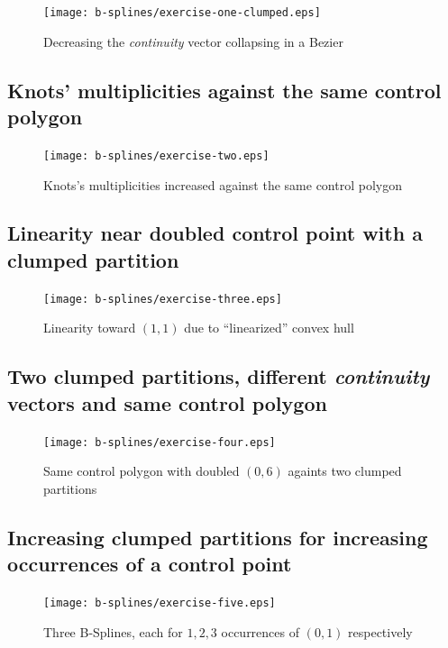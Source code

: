 \documentclass{article}
\begin{document}
\begin{figure}[h!]
  \centering
  \texttt{[image: b-splines/exercise-one-clumped.eps]}
  \caption{Decreasing the \emph{continuity} vector collapsing in a Bezier }
  \label{fig:bspline-exercise-one-clumped}
\end{figure}

\subsection{Knots' multiplicities against the same control polygon}
\begin{figure}[h!]
  \centering
  \texttt{[image: b-splines/exercise-two.eps]}
  \caption{Knots's multiplicities increased against the same control polygon }
  \label{fig:bspline-exercise-two}
\end{figure}

\subsection{Linearity near doubled control point with a clumped partition}
\begin{figure}[h!]
  \centering
  \texttt{[image: b-splines/exercise-three.eps]}
  \caption{Linearity toward $(1,1)$ due to ``linearized'' convex hull}
  \label{fig:bspline-exercise-three}
\end{figure}

\subsection{Two clumped partitions, different \emph{continuity} vectors and same control polygon}
\begin{figure}[h!]
  \centering
  \texttt{[image: b-splines/exercise-four.eps]}
  \caption{Same control polygon with doubled $(0,6)$ againts two clumped partitions}
  \label{fig:bspline-exercise-four}
\end{figure}

\subsection{Increasing clumped partitions for increasing occurrences of a control point}
\begin{figure}[h!]
  \centering
  \texttt{[image: b-splines/exercise-five.eps]}
  \caption{Three B-Splines, each for $1,2,3$ occurrences of $(0,1)$ respectively }
  \label{fig:bspline-exercise-five}
\end{figure}
\end{document}
